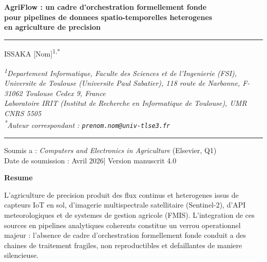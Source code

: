 \documentclass[12pt,a4paper]{article}
\theoremstyle{plain}
\theoremstyle{definition}
\theoremstyle{remark}
\begin{document}
	
	\begin{titlepage}
		\begin{center}
			\vspace*{1cm}
			
			{\LARGE\sffamily\bfseries\color{darkblue}
				AgriFlow : un cadre d'orchestration formellement fonde\\[6pt]
				pour pipelines de donnees spatio-temporelles heterogenes\\[6pt]
				en agriculture de precision}
			
			\vspace{0.8cm}
			{\color{darkblue}\rule{13cm}{1.2pt}}
			\vspace{0.45cm}
			
			{\large\sffamily
				ISSAKA [Nom]\textsuperscript{1,*}}
			
			\vspace{0.4cm}
			{\normalsize\itshape
				\textsuperscript{1}Departement Informatique, Faculte des Sciences
				et de l'Ingenierie (FSI), Universite de Toulouse (Universite Paul Sabatier),
				118 route de Narbonne, F-31062 Toulouse Cedex 9, France\\[3pt]
				Laboratoire IRIT (Institut de Recherche en Informatique de Toulouse),
				UMR CNRS 5505\\[6pt]
				\textsuperscript{*}Auteur correspondant :
				\texttt{prenom.nom@univ-tlse3.fr}}
			
			\vspace{0.65cm}
			{\color{darkblue}\rule{13cm}{0.5pt}}
			\vspace{0.4cm}
			
			{\small\sffamily
				Soumis a :
				\textit{Computers and Electronics in Agriculture} (Elsevier, Q1)\\
				Date de soumission : Avril 2026\quad|\quad
				Version manuscrit 4.0}
		\end{center}
		
		\vspace{0.7cm}
		
		\noindent\textbf{\large Resume}
		
		\medskip\noindent
		L'agriculture de precision produit des flux continus et heterogenes issus
		de capteurs IoT en sol, d'imagerie multispectrale satellitaire (Sentinel-2),
		d'API meteorologiques et de systemes de gestion agricole (FMIS).
		L'integration de ces sources en pipelines analytiques coherents constitue
		un verrou operationnel majeur : l'absence de cadre d'orchestration
		formellement fonde conduit a des chaines de traitement fragiles,
		non reproductibles et defaillantes de maniere silencieuse.
		

\end{titlepage}
\end{document}
